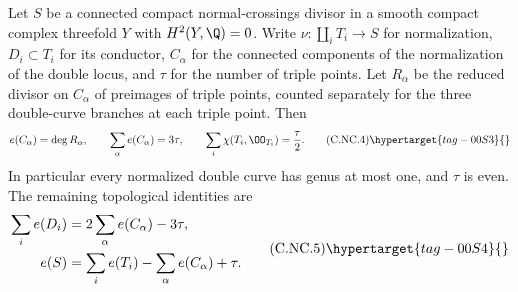 \begin{proposition}\hypertarget{tag-01C9}{}\label{cdp:st:C.2.NC.2}

Let $S$ be a connected compact normal-crossings divisor in a smooth compact complex threefold $Y$ with $H^2(Y,\Q)=0$. Write $\nu:\coprod_iT_i\to S$ for normalization, $D_i\subset T_i$ for its conductor, $C_\alpha$ for the connected components of the normalization of the double locus, and $\tau$ for the number of triple points. Let $R_\alpha$ be the reduced divisor on $C_\alpha$ of preimages of triple points, counted separately for the three double-curve branches at each triple point. Then
\[
 e(C_\alpha)=\deg R_\alpha,\qquad
 \sum_\alpha e(C_\alpha)=3\tau,
 \qquad
 \sum_i\chi(T_i,\OO_{T_i})=\frac{\tau}{2}.
 \tag{C.NC.4}\hypertarget{tag-00S3}{}\label{cdp:eq:C.NC.4}
\]
In particular every normalized double curve has genus at most one, and $\tau$ is even. The remaining topological identities are
\[
\begin{aligned}
 \sum_i e(D_i)&=2\sum_\alpha e(C_\alpha)-3\tau,\\
 e(S)&=\sum_i e(T_i)-\sum_\alpha e(C_\alpha)+\tau.
\end{aligned}
 \tag{C.NC.5}\hypertarget{tag-00S4}{}\label{cdp:eq:C.NC.5}
\]
\end{proposition}


